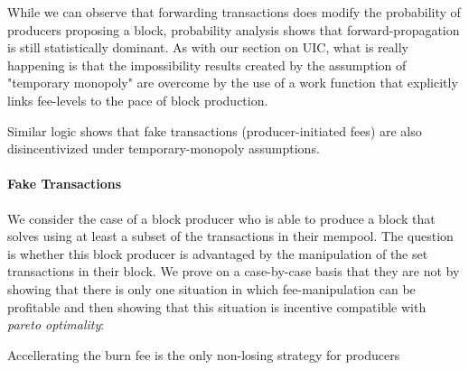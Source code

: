 While we can observe that forwarding transactions does modify the probability of producers proposing a block, probability analysis shows that forward-propagation is still statistically dominant. As with our section on UIC, what is really happening is that the impossibility results created by the assumption of "temporary monopoly" are overcome by the use of a work function that explicitly links fee-levels to the pace of block production.

Similar logic shows that fake transactions (producer-initiated fees) are also disincentivized under temporary-monopoly assumptions.

\paragraph{Fake Transactions} 

We consider the case of a block producer who is able to produce a block that solves \ourOPT using at least a subset of the transactions in their mempool. The question is whether this block producer is advantaged by the manipulation of the set transactions in their block. We prove on a case-by-case basis that they are not by showing that there is only one situation in which fee-manipulation can be profitable and then showing that this situation is incentive compatible with \textit{pareto optimality}:

\begin{theorem}\label{thm:MIC}
    Accellerating the burn fee is the only non-losing strategy for producers
\end{theorem}

